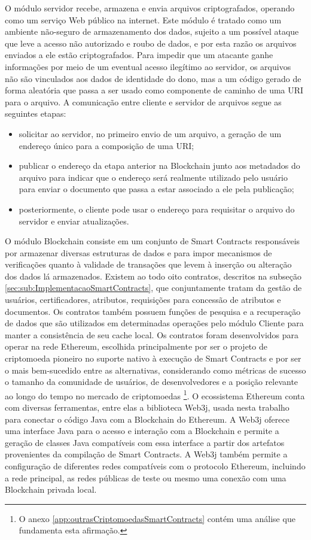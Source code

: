 \documentclass[a4paper,11pt]{article}
\begin{document}
O módulo servidor recebe, armazena e envia arquivos criptografados, operando como um serviço Web público na internet.
Este módulo é tratado como um ambiente não-seguro de armazenamento dos dados, sujeito a um possível ataque que leve a acesso não autorizado e roubo de dados, e por esta razão os arquivos enviados a ele estão criptografados.
Para impedir que um atacante ganhe informações por meio de um eventual acesso ilegítimo ao servidor, os arquivos não são vinculados aos dados de identidade do dono, mas a um código gerado de forma aleatória que passa a ser usado como componente de caminho de uma URI para o arquivo.
A comunicação entre cliente e servidor de arquivos segue as seguintes etapas:
\begin{itemize}
  \item solicitar ao servidor, no primeiro envio de um arquivo, a geração de um endereço único para a composição de uma URI;
  \item publicar o endereço da etapa anterior na Blockchain junto aos metadados do arquivo para indicar que o endereço será realmente utilizado pelo usuário para enviar o documento que passa a estar associado a ele pela publicação;
  \item posteriormente, o cliente pode usar o endereço para requisitar o arquivo do servidor e enviar atualizações.
\end{itemize}

O módulo Blockchain consiste em um conjunto de Smart Contracts responsáveis por armazenar diversas estruturas de dados e para impor mecanismos de verificações quanto à validade de transações que levem à inserção ou alteração dos dados lá armazenados.
Existem ao todo oito contratos, descritos na subseção \ref{sec:sub:ImplementacaoSmartContracts}, que conjuntamente tratam da gestão de usuários, certificadores, atributos, requisições para concessão de atributos e documentos.
Os contratos também possuem funções de pesquisa e a recuperação de dados que são utilizados em determinadas operações pelo módulo Cliente para manter a consistência de seu cache local.
Os contratos foram desenvolvidos para operar na rede Ethereum, escolhida principalmente por ser o projeto de criptomoeda pioneiro no suporte nativo à execução de Smart Contracts e por ser o mais bem-sucedido entre as alternativas, considerando como métricas de sucesso o tamanho da comunidade de usuários, de desenvolvedores e a posição relevante ao longo do tempo no mercado de criptomoedas
\footnote{O anexo \ref{app:outrasCriptomoedasSmartContracts} contém uma análise que fundamenta esta afirmação.}.
O ecossistema Ethereum conta com diversas ferramentas, entre elas a biblioteca Web3j, usada nesta trabalho para conectar o código Java com a Blockchain do Ethereum.
A Web3j oferece uma interface Java para o acesso e interação com a Blockchain e permite a geração de classes Java compatíveis com essa interface a partir dos artefatos provenientes da compilação de Smart Contracts.
A Web3j também permite a configuração de diferentes redes compatíveis com o protocolo Ethereum, incluindo a rede principal, as redes públicas de teste ou mesmo uma conexão com uma Blockchain privada local.
\end{document}
